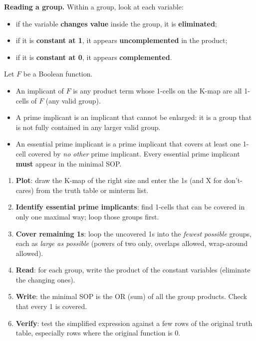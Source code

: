 \documentclass[11pt]{article}
\newcommand{\cle}[1]{{\popxbold\color{popdark}#1}}
\begin{document}
\textbf{Reading a group.} Within a group, look at each variable:
\begin{itemize}
\item if the variable \textbf{changes value} inside the group, it is \textbf{eliminated};
\item if it is \textbf{constant at 1}, it appears \textbf{uncomplemented} in the product;
\item if it is \textbf{constant at 0}, it appears \textbf{complemented}.
\end{itemize}

\begin{definition}
Let $F$ be a Boolean function.
\begin{itemize}
\item An \cle{implicant} of $F$ is any product term whose 1-cells on the K-map are all 1-cells of $F$ (any valid group).
\item A \cle{prime implicant} is an implicant that cannot be enlarged: it is a group that is not fully contained in any larger valid group.
\item An \cle{essential prime implicant} is a prime implicant that covers at least one 1-cell covered by \emph{no other} prime implicant. Every essential prime implicant \textbf{must} appear in the minimal SOP.
\end{itemize}
\end{definition}

\begin{methode}
\begin{enumerate}
\item \textbf{Plot}: draw the K-map of the right size and enter the 1s (and X for don't-cares) from the truth table or minterm list.
\item \textbf{Identify essential prime implicants}: find 1-cells that can be covered in only one maximal way; loop those groups first.
\item \textbf{Cover remaining 1s}: loop the uncovered 1s into the \emph{fewest possible} groups, each as \emph{large as possible} (powers of two only, overlaps allowed, wrap-around allowed).
\item \textbf{Read}: for each group, write the product of the constant variables (eliminate the changing ones).
\item \textbf{Write}: the minimal SOP is the OR (sum) of all the group products. Check that every 1 is covered.
\item \textbf{Verify}: test the simplified expression against a few rows of the original truth table, especially rows where the original function is 0.
\end{enumerate}
\end{methode}
\end{document}

